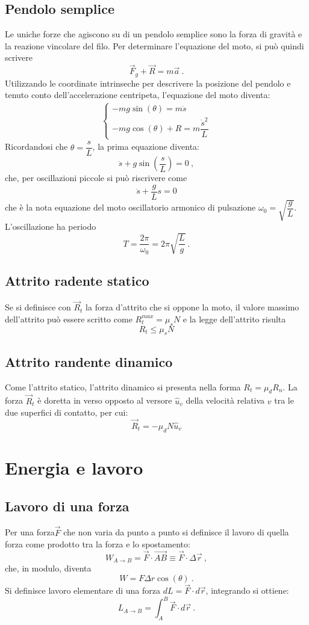 \documentclass[12pt, oneside]{book}
\begin{document}
\section{Pendolo semplice}
Le uniche forze che agiscono su di un pendolo semplice sono la forza di gravità e la reazione vincolare del filo. Per determinare l'equazione del moto, si può quindi scrivere
\[\vec F_g + \vec R = m\vec a~.\]
Utilizzando le coordinate intrinseche per descrivere la posizione del pendolo e tenuto conto dell'accelerazione centripeta, l'equazione del moto diventa:
\begin{align*}
\begin{cases}
-mg\sin (\theta)=m\ddot s\\
-mg\cos (\theta)+R=m\dfrac{\dot s^2}{L}
\end{cases}
\end{align*}
Ricordandosi che $\theta = \dfrac{s}{L}$, la prima equazione diventa:
\[\ddot s + g\sin\left(\dfrac{s}{L}\right)=0~,\]
che, per oscillazioni piccole si può riscrivere come
\[\ddot s +\dfrac{g}{L}s=0\]
che è la nota equazione del moto oscillatorio armonico di pulsazione $\omega_0 = \sqrt{\dfrac{g}{L}}$. L'oscillazione ha periodo
\[T=\dfrac{2\pi}{\omega_0}=2\pi\sqrt{\dfrac{L}{g}}~.\]

\section{Attrito radente statico}
Se si definisce con $\vec R_t$ la forza d'attrito che si oppone la moto, il valore massimo dell'attrito può essere scritto come $R_t^{max}=\mu_s N$ e la legge dell'attrito risulta
\[ R_t \leq \mu_s N \]

\section{Attrito randente dinamico}
Come l'attrito statico, l'attrito dinamico si presenta nella forma $R_t=\mu_d R_n$. La forza $\vec R_t$ è doretta in verso opposto al versore $\hat u_v$ della velocità relativa $v$ tra le due superfici di contatto, per cui:
\[\vec R_t = -\mu_dN\hat u_v\]




\chapter{Energia e lavoro}
\section{Lavoro di una forza}
Per una forza$\vec F$ che non varia da punto a punto si definisce il lavoro di quella forza come prodotto tra la forza e lo spostamento:
\[W_{A\to B}=\vec{F}\cdot\vec{AB}\equiv\vec{F}\cdot\Delta\vec r~,\]
che, in modulo, diventa
\[W=F\Delta r\cos (\theta)~.\]
Si definisce lavoro elementare di una forza $dL=\vec{F}\cdot d\vec r$, integrando si ottiene:
\[L_{A\to B}=\int^B_A \vec{F}\cdot d\vec r~.\]
\end{document}
